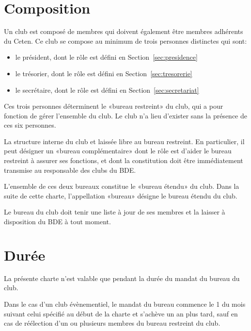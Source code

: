 \documentclass{article}
\begin{document}
\begin{multicols}{2}
{		}

		\section{Composition}
\label{sec:composition}

		{\small
		
			Un club est composé de membres qui doivent également être membres
			adhérents du Ceten. Ce club se compose au minimum de trois personnes
			distinctes qui sont:
			\begin{itemize}
				\item le président, dont le rôle est défini en
					Section~\ref{sec:presidence}
				\item le trésorier, dont le rôle est défini en
					Section~\ref{sec:tresorerie}
				\item le secrétaire, dont le rôle est défini en
					Section~\ref{sec:secretariat}
			\end{itemize}

			Ces trois personnes déterminent le «bureau restreint» du club, qui a
			pour fonction de gérer l'ensemble du club. Le club n'a lieu
			d'exister sans la présence de ces six personnes.

			La structure interne du club et laissée libre au bureau restreint.
			En particulier, il peut désigner un «bureau complémentaire» dont le
			rôle est d'aider le bureau restreint à assurer ses fonctions, et
			dont la constitution doit être immédiatement transmise au
			responsable des clubs du BDE\@.

			L'ensemble de ces deux bureaux constitue le «bureau étendu» du club.
			Dans la suite de cette charte, l'appellation «bureau» désigne le
			bureau étendu du club.

			Le bureau du club doit tenir une liste à jour de ses membres et la
			laisser à disposition du BDE à tout moment.

		}

		\section{Durée}
\label{sec:duree}

		{\small
			
			La présente charte n'est valable que pendant la durée du mandat du
			bureau du club.

			Dans le cas d'un club évènementiel, le mandat du bureau commence le
			1 du mois suivant celui spécifié au début de la charte et
			s'achève un an plus tard, sauf en cas de réélection d'un ou
			plusieurs membres du bureau restreint du club.

}
\end{multicols}
\end{document}
